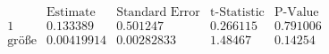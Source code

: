 \[\begin{array}{l|llll}
 \text{} & \text{Estimate} & \text{Standard Error} & \text{t-Statistic} & \text{P-Value} \\
\hline
 1 & 0.133389 & 0.501247 & 0.266115 & 0.791006 \\
 \text{gr{\" o}{\ss}e} & 0.00419914 & 0.00282833 & 1.48467 & 0.14254 \\
\end{array}\]

